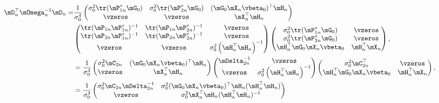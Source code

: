 \begin{equation*}
\begin{aligned}
 \mD_n^\top\mOmega_n^{-1}\mD_n = &   \frac{1}{\sigma_0^4}
 \begin{pmatrix}
  \sigma_0^2\tr(\mP^s_{1n}\mG_0) &  \sigma_0^2\tr(\mP^s_{2n}\mG_0) & (\mG_0\mX_n\vbeta_0)^\top\mH_n\\
 \vzeros & \vzeros & \mX_n^\top\mH_n
 \end{pmatrix}\\
 & 
           \begin{pmatrix}
          \tr(\mP_{1n}\mP_{1n}^s)^{-1} & \tr(\mP_{1n}\mP_{2n}^s)^{-1} & \vzeros \\
          \tr(\mP_{2n}\mP_{1n}^s)^{-1} & \tr(\mP_{2n}\mP_{2n}^s)^{-1} & \vzeros \\
          \vzeros & \vzeros & \sigma_0^2\left(\mH_n^{\top}\mH_n\right)^{-1}
          \end{pmatrix} 
         \begin{pmatrix}
           \sigma_0^2\tr(\mP^s_{1n}\mG_0) & \vzeros \\
           \sigma_0^2\tr(\mP^s_{2n}\mG_0) & \vzeros \\
           \mH_n^\top\mG_0\mX_n\vbeta_0 & \mH^\top_n\mX_n
         \end{pmatrix}, \\
         & = \frac{1}{\sigma_0^4}
         \begin{pmatrix}
         \sigma_0^2\mC_{2n} & (\mG_0\mX_n\vbeta_0)^\top\mH_n \\
         \vzeros & \mX_n^\top\mH_n
         \end{pmatrix}
         \begin{pmatrix}
          \mDelta_{2n}^{-1} & \vzeros \\
          \vzeros & \sigma_0^2\left(\mH_n^\top\mH_n\right)^{-1}
         \end{pmatrix}
         \begin{pmatrix}
          \sigma_0^2\mC_{2n}^\top & \vzeros \\
          \mH_n^\top\mG_0\mX_n\vbeta_0 & \mH^\top_n\mX_n
         \end{pmatrix}, \\
        &  = \frac{1}{\sigma_0^4}
         \begin{pmatrix}
          \sigma_0^2\mC_{2n}\mDelta_{2n}^{-1} & \sigma_0^2(\mG_0\mX_n\vbeta_0)^\top\mH_n(\mH_n^\top\mH_n) \\
          \vzeros & \sigma_0^2\mX_n^\top\mH_n(\mH_n^\top\mH_n)^{-1}
         \end{pmatrix}

\end{aligned}
\end{equation*}
